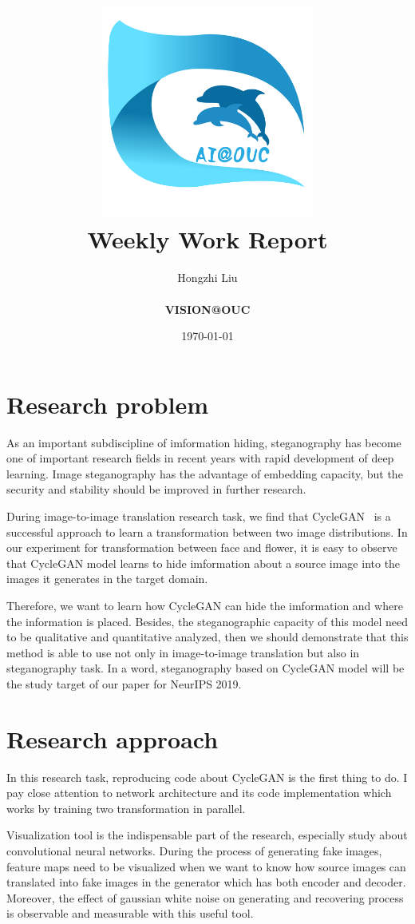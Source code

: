 \documentclass[a4paper]{article}
\title{
	\vspace*{1in}
	\includegraphics[width=2.75in]{figures/zhenglab-logo} \\
	\vspace*{1.2in}
	\textbf{\huge Weekly Work Report}
	\vspace{0.2in}
}
\author{Hongzhi Liu \\
	\vspace*{0.5in} \\
	\textbf{VISION@OUC} \\
	\vspace*{1in}
}
\date{\today}
\begin{document}
	\par
	\maketitle
	\setcounter{page}{0}
	\thispagestyle{empty}
	
	\newpage
	
	\section{Research problem}
	
	As an important subdiscipline of imformation hiding, steganography has become one of important research fields in recent years with rapid development of deep learning. Image steganography has the advantage of embedding capacity, but the security and stability should be improved in further research.
	
	During image-to-image translation research task, we find that CycleGAN~\cite{zhu2017unpaired} is a successful approach to learn a transformation between two image distributions. In our experiment for transformation between face and flower, it is easy to observe that CycleGAN model learns to hide imformation about a source image into the images it generates in the target domain.
	
	Therefore, we want to learn how CycleGAN can hide the imformation and where the information is placed. Besides, the steganographic capacity of this model need to be qualitative and quantitative analyzed, then we should demonstrate that this method is able to use not only in image-to-image translation but also in steganography task. In a word, steganography based on CycleGAN model will be the study target of our paper for NeurIPS 2019.
	
	\section{Research approach}
	
	In this research task, reproducing code about CycleGAN is the first thing to do. I pay close attention to network architecture and its code implementation which works by training two transformation in parallel.
	
	Visualization tool is the indispensable part of the research, especially study about convolutional neural networks. During the process of generating fake images, feature maps need to be visualized when we want to know how source images can translated into fake images in the generator which has both encoder and decoder. Moreover, the effect of gaussian white noise on generating and recovering process is observable and measurable with this useful tool.
	
\end{document}
